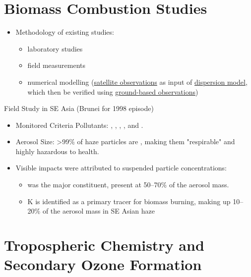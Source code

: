 \documentclass[
11pt,notheorems,hyperref={pdfauthor=whatever}
]{beamer}
\begin{document}
\section{Biomass Combustion Studies}

\begin{frame}
    \begin{itemize}
        \item Methodology of existing studies: 
        \begin{itemize}
            \item laboratory studies
            \item field measurements
            \item numerical modelling (\underline{satellite observations} as input of \underline{dispersion model}, which then be verified using \underline{ground-based observations})
        \end{itemize}
        
    \end{itemize}

    \begin{block}{Field Study in SE Asia (Brunei for 1998 episode)}
        \begin{itemize}
            \item Monitored Criteria Pollutants: \textbf{}, , , , and .
            \item Aerosol Size: >99\% of haze particles are , making them "respirable" and highly hazardous to health.
            \item Visible impacts were attributed to suspended particle concentrations: 
            
            \begin{itemize}
                \item {} was the major constituent, present at 50--70\% of the aerosol mass.
                \item K is identified as a primary tracer for biomass burning, making up 10–20\% of the aerosol mass in SE Asian haze
            \end{itemize}
        \end{itemize}
    \end{block}
\end{frame}

\section{Tropospheric Chemistry and Secondary Ozone Formation}
\end{document}
